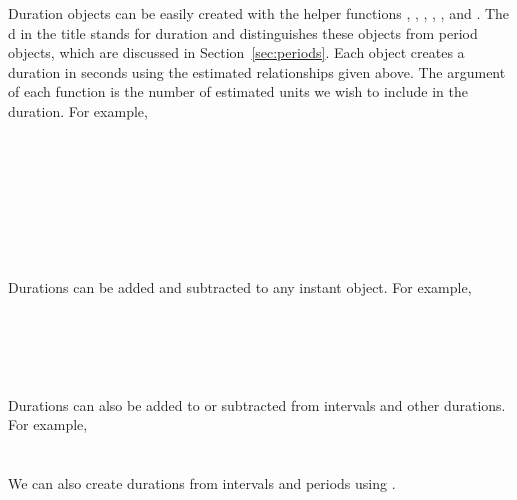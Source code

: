 \documentclass[article]{jss}
\begin{document}
Duration objects can be easily created with the helper functions 
, , , , , and  . The d in the title stands for duration and distinguishes these objects from period objects, which are discussed in Section~\ref{sec:periods}. Each object creates a duration in seconds using the estimated relationships given above. The argument of each function is the number of estimated units we wish to include in the duration. For example,\\

\\
\\

\\
\\

\\
\\

\\
\\

Durations can be added and subtracted to any instant object. For example,\\

\\
\\

\\
\\
\\

Durations can also be added to or subtracted from intervals and other durations. For example,\\

\\
\\

We can also create durations from intervals and periods using . 

\\
\\
\end{document}
